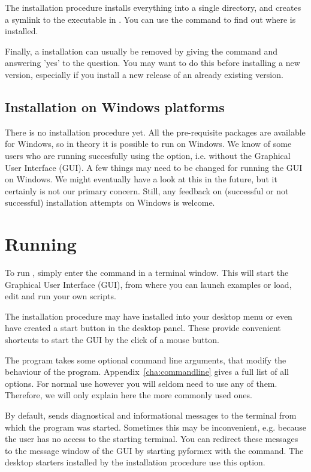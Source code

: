 The installation procedure installs everything into a single directory, and creates a symlink to the executable in .
You can use the command  to find out where \pyformex is installed. 

Finally, a \pyformex installation can usually be removed by giving the command  and answering 'yes' to the question. You may want to do this before installing a new version, especially if you install a new release of an already existing version.


\subsection{Installation on Windows platforms}
\label{sec:installation-windows}
There is no installation procedure yet. All the pre-requisite packages are available for Windows, so in theory it is possible to run \pyformex on Windows. We know of some users who are running \pyformex succesfully using the  option, i.e. without the Graphical User Interface (GUI).  
A few things may need to be changed for running the GUI on Windows. We might eventually have a look at this in the future, but it certainly is not our primary concern.
Still, any feedback on (successful or not successful) installation attempts on Windows is welcome.


\section{Running \pyf}
\label{sec:running}
To run \pyf, simply enter the command  in a terminal window. This will start the \pyf Graphical User Interface (GUI), from where you can launch examples or load, edit and run your own \pyf scripts. 

The installation procedure may have installed \pyf into your desktop menu or even have created a start button in the desktop panel. These provide convenient shortcuts to start the \pyf GUI by the click of a mouse button.

The \pyf program takes some optional command line arguments, that modify the behaviour of the program. Appendix~\ref{cha:commandline} gives a full list of all options. For normal use however you will seldom need to use any of them.
Therefore, we will only explain here the more commonly used ones.

By default, \pyf sends diagnostical and informational messages to the terminal from which the program was started. Sometimes this may be inconvenient, e.g. because the user has no access to the starting terminal. You can redirect these messages to the message window of the \pyf GUI by starting pyformex with the command. The desktop starters installed by the \pyf installation procedure use this option.

